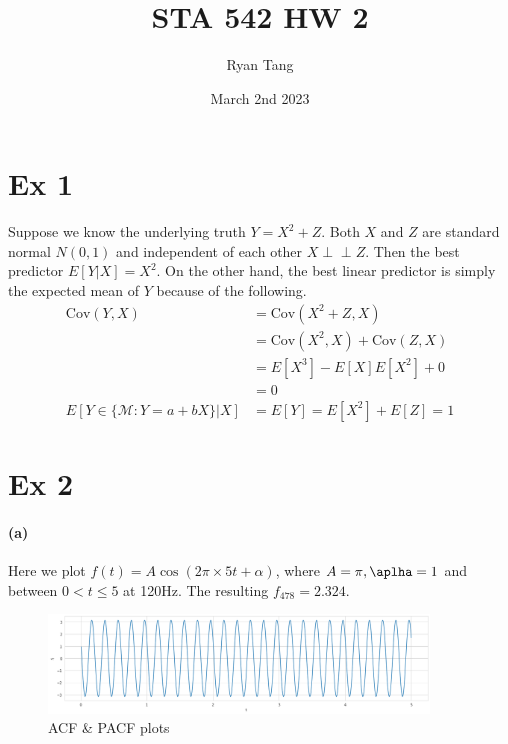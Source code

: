 \documentclass[11pt, letterpaper]{article}
\author{Ryan Tang}
\title{STA 542 HW 2}
\date{March 2nd 2023}
\newcommand{\indep}{\perp \!\!\! \perp}
\begin{document}
\maketitle

\section{Ex 1}
Suppose we know the underlying truth $Y = X^2 + Z$. Both $X$ and $Z$ are standard normal $N(0,1)$ and independent of each other $X \indep Z$. Then the best predictor $E[Y|X] = X^2$. On the other hand, the best linear predictor is simply the expected mean of $Y$ because of the following.
\begin{align*}
    \text{Cov}(Y, X) &= \text{Cov}(X^2 + Z, X) \\
        &= \text{Cov}(X^2, X) + \text{Cov}(Z, X) \\
        &= E[X^3] - E[X]E[X^2] + 0 \\
        &= 0 \\
    E[Y \in \{\mathcal{M}: Y = a + bX\}|X] &= E[Y] = E[X^2] + E[Z] = 1
\end{align*}

\section{Ex 2}
\paragraph{(a)}
Here we plot $f(t) = A \cos(2\pi \times 5t + \alpha)$, where $A = \pi, \aplha = 1$ and between $0 < t \leq 5$ at 120Hz. The resulting $f_{478} = 2.324$.

\begin{figure}[!h]
  \centering
  \includegraphics[width=0.9\textwidth]{plot1.png}
  \captionsetup{justification=centering}
  \caption{ACF & PACF plots}
\end{figure}
\end{document}

